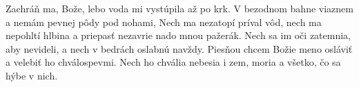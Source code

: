 Zachráň ma, Bože,
lebo voda mi vystúpila až po krk.
\versseparator
V bezodnom bahne viaznem a nemám pevnej pôdy pod nohami,
\versseparator
Nech ma nezatopí príval vôd,
nech ma nepohltí hlbina
a priepasť nezavrie nado mnou pažerák.
\versseparator
Nech sa im oči zatemnia, aby nevideli,
a nech v bedrách oslabnú navždy.
\versseparator
Piesňou chcem Božie meno osláviť
a velebiť ho chválospevmi.
\versseparator
Nech ho chvália nebesia i zem,
moria a všetko, čo sa hýbe v nich.